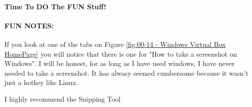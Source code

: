 \paragraph{Time To DO The FUN Stuff!}

\paragraph{FUN NOTES:} If you look at one of the tabs on Figure \vref{fig:00-14 - Windows Virtual Box HomePage}
you will notice that there is one for "How to take a screenshot on Windows". I
will be honest, for as long as I have used windows, I have never needed to take a
screenshot. It has alwasy seemed cumbersome because it wasn't just a hotkey like
Linux.

I highly recommend the Snipping Tool

\clearpage